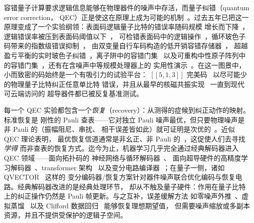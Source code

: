 \documentclass[11pt,a4paper]{article}
\newcommand{\code}{[\![5,1,3]\!]}
\begin{document}
容错量子计算要求逻辑信息能够在物理器件的噪声中存活，而量子纠错（quantum error correction，
QEC）正是使这在原理上成为可能的机制~\cite{shor_code,steane_code,
knill_theory}。过去五年已把这一原理变成了一个实验纲领：表面码逻辑量子比特的错误率随码规模
增长而下降~\cite{fowler_surface,
google_scaling}，逻辑错误率被压到表面码阈值以下~\cite{google_below_threshold}，
可检错表面码中的逻辑操作~\cite{marques_d3}，循环玻色子码带来的指数级错误抑制~\cite{google_cyclic}，
由双变量自行车码构造的低开销容错存储器~\cite{bravyi_bb}，
超越盈亏平衡的实时玻色子纠错~\cite{sivak_breakeven,
brock_qudits}，离子阱中的容错门集~\cite{ryan_anderson_rt,postler_ft,honciuc_832}
以及可重构中性原子阵列中的容错门集~\cite{bluvstein_atoms}，还有在含噪声中等规模处理器上的
实用性演示~\cite{ibm_utility}。在这一图景中，小而致密的码始终是一个有吸引力的试验平台：
$\code$ 完美码~\cite{laflamme_5q,gottesman_hamming} 以尽可能少的物理量子比特纠正任意单比特
错误，并且从最早的核磁共振实现~\cite{knill_bench5q,zhang_nmr5q} 一直到现代可云端访问的
超导器件都已被反复基准测试。

每一个 QEC 实验都包含一个\emph{恢复}（recovery）：从测得的症候到纠正动作的映射。标准恢复是
刚性的 Pauli 查表——它对独立 Pauli 噪声最优，但只要物理噪声是非 Pauli 的（振幅阻尼、串扰、
相干误差皆如此）就可证明是次优的~\cite{knill_theory,beny_optimal,petz_map}。近似 QEC 理论表明，
最优恢复信道通常是非幺正、非 Pauli 的~\cite{petz_map,beny_optimal}，这促使人们去寻找\emph{学得}
而非查表的恢复方式。迄今为止，机器学习几乎完全通过经典解码器进入 QEC 领域——面向拓扑码的
神经网络与循环解码器~\cite{torlai_nn,baireuther_njp,meinerz_nn,wang_nn_boson}、
面向超导硬件的高精度学习解码器~\cite{bausch_ml}、transformer 架构~\cite{tian_transformer}
以及变分电路编译器~\cite{xu_vcc}；在量子一侧，诸如 QVECTOR~\cite{johnson_qvector} 这样的
变分编码器/恢复方案针对器件噪声联合优化编码与恢复电路。经典解码器改进的是经典处理环节，
却从不触及量子硬件：作用在量子比特上的纠正操作仍然是 Pauli 帧更新。与之互补，误差缓解方法
如零噪声外推~\cite{temme_zne,endo_zne,kandala_zne_hw}、虚拟蒸馏~\cite{huggins_vd,vikstal_vd}
以及 Clifford 数据回归~\cite{czarnik_cdr,cai_em_review} 能够恢复理想期望值，
但需要噪声缩放或多副本资源，并且不提供受保护的逻辑子空间。
\end{document}
